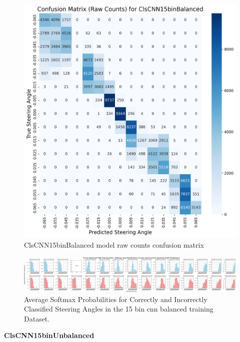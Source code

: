 \begin{figure}[H]
\centering
\includegraphics[width=1\linewidth]{Figures/Results/cm_raw_ClsCNN15binBalanced.png}
\caption{ClsCNN15binBalanced model raw counts confusion matrix}
\label{fig:cm_raw_ClsCNN15binBalanced}
\end{figure}

\begin{figure}[H]
    \centering
    \includegraphics[width=1\linewidth]{Figures/Results/15_bins_cnn_softmax_dist_plot_balanced.png}
    \caption{Average Softmax Probabilities for Correctly and Incorrectly Classified Steering Angles in the 15 bin cnn balanced training Dataset.}
    \label{fig:15_bins_cnn_softmax_dist_balanced}
\end{figure}


\textbf{ClsCNN15binUnbalanced}


